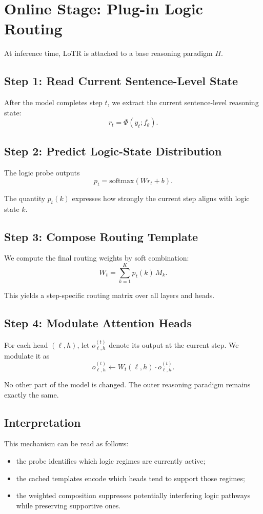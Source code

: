 \documentclass[11pt]{article}
\begin{document}
\section{Online Stage: Plug-in Logic Routing}

At inference time, LoTR is attached to a base reasoning paradigm $\Pi$.

\subsection{Step 1: Read Current Sentence-Level State}

After the model completes step $t$, we extract the current sentence-level reasoning state:
\[
r_t = \Phi(y_t; f_\theta).
\]

\subsection{Step 2: Predict Logic-State Distribution}

The logic probe outputs
\[
p_t = \mathrm{softmax}(W r_t + b).
\]

The quantity $p_t(k)$ expresses how strongly the current step aligns with logic state $k$.

\subsection{Step 3: Compose Routing Template}

We compute the final routing weights by soft combination:
\[
W_t = \sum_{k=1}^{K} p_t(k)\, M_k.
\]

This yields a step-specific routing matrix over all layers and heads.

\subsection{Step 4: Modulate Attention Heads}

For each head $(\ell,h)$, let $o_{\ell,h}^{(t)}$ denote its output at the current step. We modulate it as
\[
o_{\ell,h}^{(t)} \leftarrow W_t(\ell,h)\cdot o_{\ell,h}^{(t)}.
\]

No other part of the model is changed. The outer reasoning paradigm remains exactly the same.

\subsection{Interpretation}

This mechanism can be read as follows:
\begin{itemize}[leftmargin=1.5em]
    \item the probe identifies which logic regimes are currently active;
    \item the cached templates encode which heads tend to support those regimes;
    \item the weighted composition suppresses potentially interfering logic pathways while preserving supportive ones.
\end{itemize}
\end{document}
